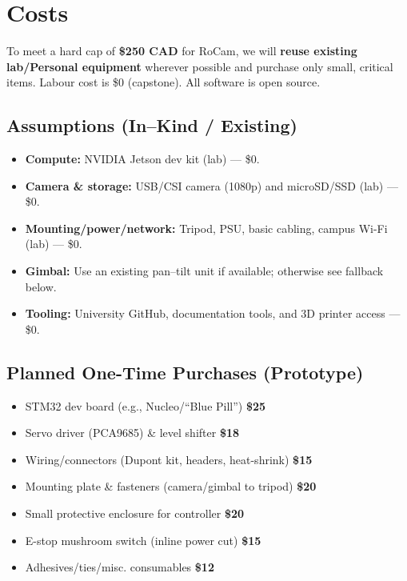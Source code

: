 \documentclass[12pt]{article}
\begin{document}
\section{Costs}
\label{sec:costs}

To meet a hard cap of \textbf{\$250 CAD} for RoCam, we will \textbf{reuse
  existing lab/Personal equipment} wherever possible and purchase only small,
critical items. Labour cost is \$0 (capstone). All software is open source.

\subsection*{Assumptions (In–Kind / Existing)}
\begin{itemize}
  \item \textbf{Compute:} NVIDIA Jetson dev kit (lab) — \$0.
  \item \textbf{Camera \& storage:} USB/CSI camera (1080p) and microSD/SSD (lab) — \$0.
  \item \textbf{Mounting/power/network:} Tripod, PSU, basic cabling, campus Wi-Fi (lab) — \$0.
  \item \textbf{Gimbal:} Use an existing pan–tilt unit if available; otherwise see fallback below.
  \item \textbf{Tooling:} University GitHub, documentation tools, and 3D printer access — \$0.
\end{itemize}

\subsection*{Planned One-Time Purchases (Prototype)}
\begin{itemize}
  \item STM32 dev board (e.g., Nucleo/“Blue Pill”) \dotfill \textbf{\$25}
  \item Servo driver (PCA9685) \& level shifter \dotfill \textbf{\$18}
  \item Wiring/connectors (Dupont kit, headers, heat-shrink) \dotfill \textbf{\$15}
  \item Mounting plate \& fasteners (camera/gimbal to tripod) \dotfill \textbf{\$20}
  \item Small protective enclosure for controller \dotfill \textbf{\$20}
  \item E-stop mushroom switch (inline power cut) \dotfill \textbf{\$15}
  \item Adhesives/ties/misc. consumables \dotfill \textbf{\$12}
\end{itemize}
\end{document}
